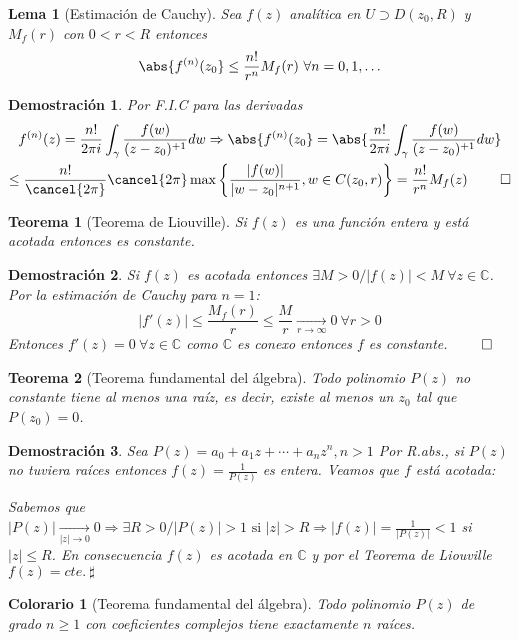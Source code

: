 \documentclass[12pt]{book}
\newtheorem{theorem}{Teorema}[chapter]
\newtheorem*{dem}{Demostración}
\newtheorem{col}{Colorario}[chapter]
\newtheorem{lema}{Lema}[chapter]
\newcommand{\C}{\mathbb{C}}
\begin{document}
\begin{lema}[Estimación de Cauchy]
Sea $f(z)$ analítica en $U \supset D(z_0,R)$ y $M_f(r)$ con $0<r<R$ entonces
$$\abs{ f^{(n)}(z_0} \leq \frac{n!}{r^n}M_f(r)\ \forall n = 0,1,\ldots$$
\end{lema}

\begin{dem}
Por F.I.C para las derivadas
\begin{multline*}
f^{(n)}(z) = \frac{n!}{2\pi i}\int_\gamma \frac{f(w)}{(z-z_0)^{+1}}dw \Rightarrow \abs{ f^{(n)}(z_0} = \abs{ \frac{n!}{2\pi i}\int_\gamma \frac{f(w)}{(z-z_0)^{+1}}dw }\\
 \leq \frac{n!}{\cancel{2\pi}}\cancel{2\pi} \max\left\lbrace\frac{|f(w)|}{|w-z_0|^{n+1}}, w\in C(z_0,r)\right\rbrace = \frac{n!}{r^n}M_f(z) \ \qed
\end{multline*}
\end{dem}


\begin{theorem}[Teorema de Liouville]
Si $f(z)$ es una función entera y está acotada entonces es constante.
\end{theorem}

\begin{dem}
Si $f(z)$ es acotada entonces $\exists M>0 / |f(z)|<M \ \forall z\in \C$. Por la estimación de Cauchy para $n=1$:
$$|f'(z)| \leq \frac{M_f(r)}{r}\leq \frac{M}{r} \xrightarrow[r\to \infty]{} 0 \ \forall r>0$$ Entonces $f'(z)=0 \ \forall z\in\C$ como $\C$ es conexo entonces $f$ es constante. $\qed$
\end{dem}


\begin{theorem}[Teorema fundamental del álgebra]
Todo polinomio $P(z)$ no constante tiene al menos una raíz, es decir, existe al menos un $z_0$ tal que $P(z_0)=0$.
\end{theorem}


\begin{dem}
Sea $P(z) = a_0 + a_1z + \cdots + a_n z^n, n>1$ Por R.abs., si $P(z)$ no tuviera raíces entonces $f(z) = \frac{1}{P(z)}$ es entera. Veamos que $f$ está acotada:

Sabemos que $\displaystyle |P(z)|\xrightarrow[|z|\to 0]{} 0 \Rightarrow \exists R>0 / |P(z)|>1 \text{ si } |z| >R \Rightarrow |f(z)| = \frac{1}{|P(z)|} <1$ si $|z|\leq R$. En consecuencia $f(z)$ es acotada en $\C$ y por el Teorema de Liouville $f(z) = cte.\ \sharp$
\end{dem}

\begin{col}[Teorema fundamental del álgebra]
Todo polinomio $P(z)$ de grado $n\geq 1$ con coeficientes complejos tiene exactamente $n$ raíces.
\end{col}
\end{document}

